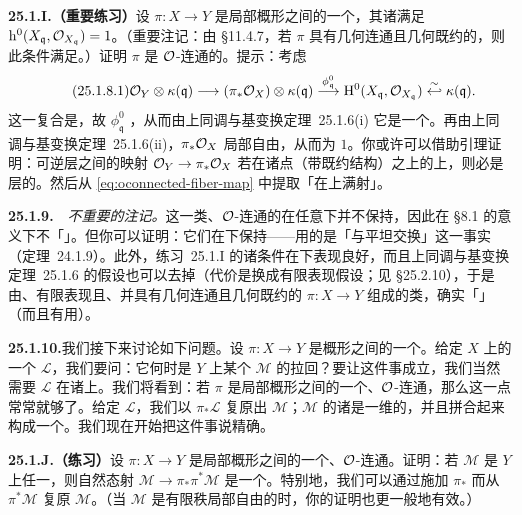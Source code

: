 \textbf{25.1.I.（重要练习）}\quad 设 $\pi\colon X\to Y$ 是局部\trNoether{}概形之间的一个\trProper\trFlat\trMorphism，其诸\trFiber{}满足 $\mathrm{h}^0(X_{\mathfrak{q}},\mathcal{O}_{X_{\mathfrak{q}}})=1$。（重要注记：由 \S11.4.7，若 $\pi$ 具有几何连通且几何既约的\trFiber，则此条件满足。）证明 $\pi$ 是 $\mathcal{O}$-连通的。提示：考虑
\begin{equation*}\tag{25.1.8.1}\label{eq:oconnected-fiber-map}
\mathcal{O}_Y\otimes\kappa(\mathfrak{q})\longrightarrow(\pi_*\mathcal{O}_X)\otimes\kappa(\mathfrak{q})\overset{\phi^0_{\mathfrak{q}}}{\longrightarrow}\mathrm{H}^0(X_{\mathfrak{q}},\mathcal{O}_{X_{\mathfrak{q}}})\overset{\sim}{\hookleftarrow}\kappa(\mathfrak{q}).
\end{equation*}
这一复合是\trSurjectiveMap，故 $\phi^0_{\mathfrak{q}}$ \trSurjectiveMap，从而由\mbox{上同调与基变换定理~25.1.6}(i) 它是一个\trIsomorphism。再由\mbox{上同调与基变换定理~25.1.6}(ii)，$\pi_*\mathcal{O}_X$ 局部自由，从而\trRank{}为 $1$。你或许可以借助\trNakayama{}引理证明：可逆层之间的映射 $\mathcal{O}_Y\to\pi_*\mathcal{O}_X$ 若在诸点（带既约结构）之上的\trFiber{}上\trSurjectiveMap{}，则必是层的\trIsomorphism。然后从 \eqref{eq:oconnected-fiber-map} 中提取「在\trFiber{}上满射」。

\textbf{25.1.9.}\ \hard\ \emph{不重要的注记。}\quad 这一类\trProper{}、$\mathcal{O}$-连通的\trMorphism{}在任意\trBaseChange{}下并不保持，因此在 \S8.1 的意义下不「\trReasonable」。但你可以证明：它们在\trFlat\trBaseChange{}下保持——用的是「\trCohomology{}与平坦\trBaseChange{}交换」这一事实（\mbox{定理~24.1.9}）。此外，\mbox{练习~25.1.I} 的诸条件在\trBaseChange{}下表现良好，而且\mbox{上同调与基变换定理~25.1.6} 的\trNoether{}假设也可以去掉（代价是换成有限表现假设；见 \S25.2.10），于是由\trProper{}、有限表现且\trFlat、并具有几何连通且几何既约\trFiber{}的\trMorphism{} $\pi\colon X\to Y$ 组成的类，确实「\trReasonable」（而且有用）。

\textbf{25.1.10.}\quad 我们接下来讨论如下问题。设 $\pi\colon X\to Y$ 是概形之间的一个\trMorphism。给定 $X$ 上的一个\trInvertibleSheaf{} $\mathscr{L}$，我们要问：它何时是 $Y$ 上某个\trInvertibleSheaf{} $\mathscr{M}$ 的拉回？要让这件事成立，我们当然需要 $\mathscr{L}$ 在诸\trFiber{}上\trTrivial。我们将看到：若 $\pi$ 是局部\trNoether{}概形之间的一个\trProper{}、$\mathcal{O}$-连通\trMorphism，那么这一点常常就够了。给定 $\mathscr{L}$，我们以 $\pi_*\mathscr{L}$ 复原出 $\mathscr{M}$；$\mathscr{M}$ 的诸\trFiber{}是一维的，并且拼合起来构成一个\trLineBundle。我们现在开始把这件事说精确。

\textbf{25.1.J.（练习）}\quad 设 $\pi\colon X\to Y$ 是局部\trNoether{}概形之间的一个\trProper{}、$\mathcal{O}$-连通\trMorphism。证明：若 $\mathscr{M}$ 是 $Y$ 上任一\trInvertibleSheaf，则自然态射 $\mathscr{M}\to\pi_*\pi^*\mathscr{M}$ 是一个\trIsomorphism。特别地，我们可以通过施加\trPushforward{} $\pi_*$ 而从 $\pi^*\mathscr{M}$ 复原 $\mathscr{M}$。（当 $\mathscr{M}$ 是有限秩局部自由的时，你的证明也更一般地有效。）

